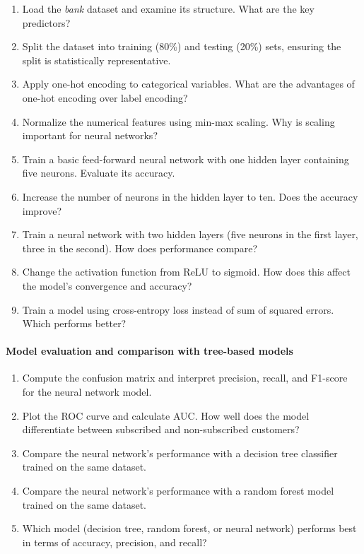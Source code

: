 \documentclass[
]{book}
\providecommand{\tightlist}{%
  \setlength{\itemsep}{0pt}\setlength{\parskip}{0pt}}
\theoremstyle{definition}
\theoremstyle{definition}
\theoremstyle{definition}
\theoremstyle{definition}
\theoremstyle{remark}
\begin{document}
\begin{enumerate}
\def\labelenumi{\arabic{enumi}.}
\setcounter{enumi}{14}
\tightlist
\item
  Load the \emph{bank} dataset and examine its structure. What are the key predictors?
\item
  Split the dataset into training (80\%) and testing (20\%) sets, ensuring the split is statistically representative.
\item
  Apply one-hot encoding to categorical variables. What are the advantages of one-hot encoding over label encoding?
\item
  Normalize the numerical features using min-max scaling. Why is scaling important for neural networks?
\item
  Train a basic feed-forward neural network with one hidden layer containing five neurons. Evaluate its accuracy.
\item
  Increase the number of neurons in the hidden layer to ten. Does the accuracy improve?
\item
  Train a neural network with two hidden layers (five neurons in the first layer, three in the second). How does performance compare?
\item
  Change the activation function from ReLU to sigmoid. How does this affect the model's convergence and accuracy?
\item
  Train a model using cross-entropy loss instead of sum of squared errors. Which performs better?
\end{enumerate}

\paragraph*{Model evaluation and comparison with tree-based models}\label{model-evaluation-and-comparison-with-tree-based-models}

\begin{enumerate}
\def\labelenumi{\arabic{enumi}.}
\setcounter{enumi}{23}
\tightlist
\item
  Compute the confusion matrix and interpret precision, recall, and F1-score for the neural network model.
\item
  Plot the ROC curve and calculate AUC. How well does the model differentiate between subscribed and non-subscribed customers?
\item
  Compare the neural network's performance with a decision tree classifier trained on the same dataset.
\item
  Compare the neural network's performance with a random forest model trained on the same dataset.
\item
  Which model (decision tree, random forest, or neural network) performs best in terms of accuracy, precision, and recall?
\end{enumerate}
\end{document}
